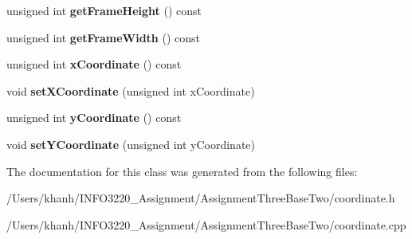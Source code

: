 \begin{DoxyCompactItemize}
\item 
\hypertarget{class_coordinate_af27554be1631cfe18e11d037b0a76f1c}{unsigned int {\bfseries get\+Frame\+Height} () const }\label{class_coordinate_af27554be1631cfe18e11d037b0a76f1c}

\item 
\hypertarget{class_coordinate_a16e4108fb43cad96e75a97aac63af5a4}{unsigned int {\bfseries get\+Frame\+Width} () const }\label{class_coordinate_a16e4108fb43cad96e75a97aac63af5a4}

\item 
\hypertarget{class_coordinate_a6aa4c2ebe9d0225642c86795db9effba}{unsigned int {\bfseries x\+Coordinate} () const }\label{class_coordinate_a6aa4c2ebe9d0225642c86795db9effba}

\item 
\hypertarget{class_coordinate_a9bf5e4d8dfcb67b62f113faa24c74b02}{void {\bfseries set\+X\+Coordinate} (unsigned int x\+Coordinate)}\label{class_coordinate_a9bf5e4d8dfcb67b62f113faa24c74b02}

\item 
\hypertarget{class_coordinate_adb61a1b6d57802279753281f43b00bc9}{unsigned int {\bfseries y\+Coordinate} () const }\label{class_coordinate_adb61a1b6d57802279753281f43b00bc9}

\item 
\hypertarget{class_coordinate_af6337bcc9e039e7fab1c5b066a33718e}{void {\bfseries set\+Y\+Coordinate} (unsigned int y\+Coordinate)}\label{class_coordinate_af6337bcc9e039e7fab1c5b066a33718e}

\end{DoxyCompactItemize}


The documentation for this class was generated from the following files\+:\begin{DoxyCompactItemize}
\item 
/\+Users/khanh/\+I\+N\+F\+O3220\+\_\+\+Assignment/\+Assignment\+Three\+Base\+Two/coordinate.\+h\item 
/\+Users/khanh/\+I\+N\+F\+O3220\+\_\+\+Assignment/\+Assignment\+Three\+Base\+Two/coordinate.\+cpp\end{DoxyCompactItemize}
